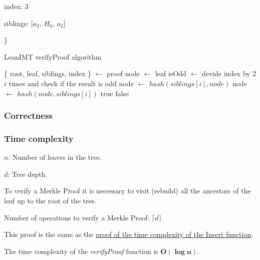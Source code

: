 \documentclass{article}
\begin{document}
index: 3

siblings: [$a_2$, $H_0$, $a_2$]

\}

\bigbreak

\bigbreak

\begin{algorithm}[H]
    \caption{LeanIMT verifyProof algorithm}\label{verifyProof}
    \begin{algorithmic}[1]
        \State \{ root, leaf, siblings, index \} $\gets$ proof 
        \State node $\gets$ leaf
        \State isOdd $\gets$ devide index by 2 $i$ times and check if the result is odd
         
        \State node $\gets$ $hash(siblings[i], node)$
        \Else {}
        \State node $\gets$ $hash(node, siblings[i])$
        \EndIf
        \EndFor
        \State \Return true
        \Else
        \State \Return false
        \EndIf
        \EndProcedure
    \end{algorithmic}
\end{algorithm}

\bigbreak

\subsubsection{Correctness}

\bigbreak

\subsubsection{Time complexity}

\bigbreak

$n$: Number of leaves in the tree.

$d$: Tree depth.

\bigbreak

To verify a Merkle Proof it is necessary to visit (rebuild) all the ancestors of the leaf up to the root of the tree.

\bigbreak

Number of operations to verify a Merkle Proof: $\lceil d \rceil$

This proof is the same as the \hyperref[InsertProof]{proof of the time complexity of the Insert function}.

The time complexity of the \textit{verifyProof} function is $\boldsymbol{O(\log n)}$.
\end{document}
